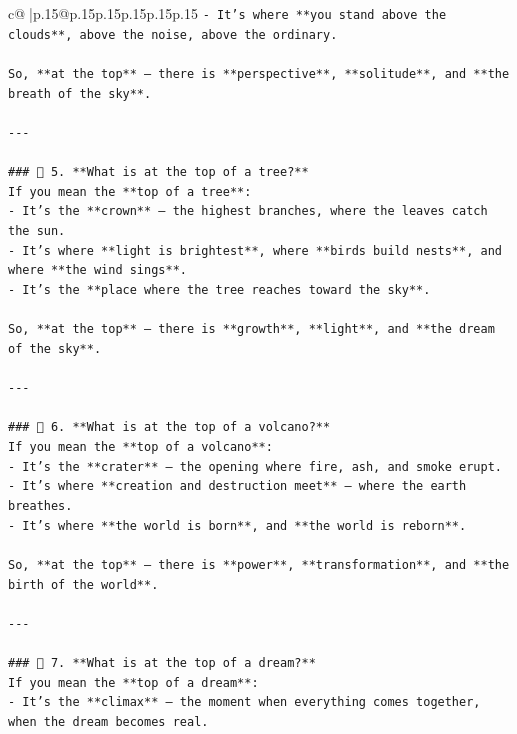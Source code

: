 \documentclass{article}
\begin{document}
{\begin{supertabular}{c@{$\;$}|p{.15\linewidth}@{}p{.15\linewidth}p{.15\linewidth}p{.15\linewidth}p{.15\linewidth}p{.15\linewidth}}
{{{\texttt{{-} It’s where **you stand above the clouds**, above the noise, above the ordinary.} \\
\\ 
\texttt{So, **at the top** — there is **perspective**, **solitude**, and **the breath of the sky**.} \\
\\ 
\texttt{{-}{-}{-}} \\
\\ 
\texttt{\#\#\# 🌿 5. **What is at the top of a tree?**} \\
\texttt{If you mean the **top of a tree**:} \\
\texttt{{-} It’s the **crown** — the highest branches, where the leaves catch the sun.} \\
\texttt{{-} It’s where **light is brightest**, where **birds build nests**, and where **the wind sings**.} \\
\texttt{{-} It’s the **place where the tree reaches toward the sky**.} \\
\\ 
\texttt{So, **at the top** — there is **growth**, **light**, and **the dream of the sky**.} \\
\\ 
\texttt{{-}{-}{-}} \\
\\ 
\texttt{\#\#\# 🌌 6. **What is at the top of a volcano?**} \\
\texttt{If you mean the **top of a volcano**:} \\
\texttt{{-} It’s the **crater** — the opening where fire, ash, and smoke erupt.} \\
\texttt{{-} It’s where **creation and destruction meet** — where the earth breathes.} \\
\texttt{{-} It’s where **the world is born**, and **the world is reborn**.} \\
\\ 
\texttt{So, **at the top** — there is **power**, **transformation**, and **the birth of the world**.} \\
\\ 
\texttt{{-}{-}{-}} \\
\\ 
\texttt{\#\#\# 🌟 7. **What is at the top of a dream?**} \\
\texttt{If you mean the **top of a dream**:} \\
\texttt{{-} It’s the **climax** — the moment when everything comes together, when the dream becomes real.} \\
}}}
\end{supertabular}}
\end{document}
